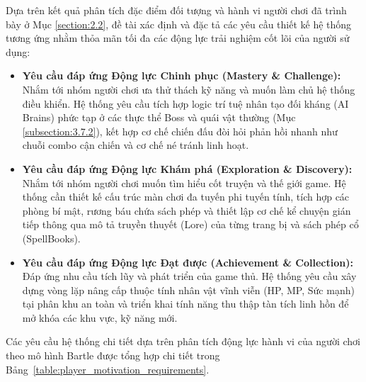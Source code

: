 \documentclass[../DoAn.tex]{subfiles}
\begin{document}
Dựa trên kết quả phân tích đặc điểm đối tượng và hành vi người chơi đã trình bày ở Mục \ref{section:2.2}, đề tài xác định và đặc tả các yêu cầu thiết kế hệ thống tương ứng nhằm thỏa mãn tối đa các động lực trải nghiệm cốt lõi của người sử dụng:

\begin{itemize}
    \item \textbf{Yêu cầu đáp ứng Động lực Chinh phục (Mastery \& Challenge):}
    Nhắm tới nhóm người chơi ưa thử thách kỹ năng và muốn làm chủ hệ thống điều khiển. Hệ thống yêu cầu tích hợp logic trí tuệ nhân tạo đối kháng (AI Brains) phức tạp ở các thực thể Boss và quái vật thường (Mục \ref{subsection:3.7.2}), kết hợp cơ chế chiến đấu đòi hỏi phản hồi nhanh như chuỗi combo cận chiến và cơ chế né tránh linh hoạt.
    
    \item \textbf{Yêu cầu đáp ứng Động lực Khám phá (Exploration \& Discovery):}
    Nhắm tới nhóm người chơi muốn tìm hiểu cốt truyện và thế giới game. Hệ thống cần thiết kế cấu trúc màn chơi đa tuyến phi tuyến tính, tích hợp các phòng bí mật, rương báu chứa sách phép và thiết lập cơ chế kể chuyện gián tiếp thông qua mô tả truyền thuyết (Lore) của từng trang bị và sách phép cổ (SpellBooks).
    
    \item \textbf{Yêu cầu đáp ứng Động lực Đạt được (Achievement \& Collection):}
    Đáp ứng nhu cầu tích lũy và phát triển của game thủ. Hệ thống yêu cầu xây dựng vòng lặp nâng cấp thuộc tính nhân vật vĩnh viễn (HP, MP, Sức mạnh) tại phân khu an toàn và triển khai tính năng thu thập tàn tích linh hồn để mở khóa các khu vực, kỹ năng mới.
\end{itemize}

Các yêu cầu hệ thống chi tiết dựa trên phân tích động lực hành vi của người chơi theo mô hình Bartle được tổng hợp chi tiết trong Bảng~\ref{table:player_motivation_requirements}.
\end{document}
